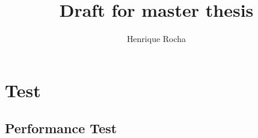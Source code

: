 \documentclass[
10pt, %
a4paper, %
oneside, %
]{scrartcl}
\title{Draft for master thesis} %
\author{Henrique Rocha}
\date{}
\begin{document}
	\maketitle %


	\section{Test}



\subsection{Performance Test}

	\begin{center}
		
	\end{center}

	\begin{center}
		
	\end{center}

	\begin{center}
		
	\end{center}
\end{document}
